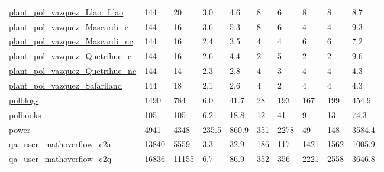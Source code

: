 \begin{longtable}{llllllllll}
 \href{https://iwdb.nceas.ucsb.edu/html/vazquez_2002.html}{plant\_pol\_vazquez\_Llao\_Llao}                                     & 144        & 20    & 3.0    & 4.6    & 8     & 6      & 8      & 8      & 8.7     \\
 \href{https://iwdb.nceas.ucsb.edu/html/vazquez_2002.html}{plant\_pol\_vazquez\_Mascardi\_c}                                    & 144        & 16    & 3.6    & 5.3    & 8     & 6      & 4      & 4      & 9.3     \\
 \href{https://iwdb.nceas.ucsb.edu/html/vazquez_2002.html}{plant\_pol\_vazquez\_Mascardi\_nc}                                   & 144        & 16    & 2.4    & 3.5    & 4     & 4      & 6      & 6      & 7.2     \\
 \href{https://iwdb.nceas.ucsb.edu/html/vazquez_2002.html}{plant\_pol\_vazquez\_Quetrihue\_c}                                   & 144        & 16    & 2.6    & 4.4    & 2     & 5      & 2      & 2      & 9.6     \\
 \href{https://iwdb.nceas.ucsb.edu/html/vazquez_2002.html}{plant\_pol\_vazquez\_Quetrihue\_nc}                                  & 144        & 14    & 2.3    & 2.8    & 4     & 3      & 4      & 4      & 4.3     \\
 \href{https://iwdb.nceas.ucsb.edu/html/vazquez_2002.html}{plant\_pol\_vazquez\_Safariland}                                    & 144        & 18    & 2.1    & 2.6    & 4     & 2      & 4      & 4      & 4.3     \\
 \href{http://www-personal.umich.edu/~mejn/netdata}{polblogs}                                                               & 1490       & 784   & 6.0    & 41.7   & 28    & 193    & 167    & 199    & 454.9   \\
 \href{http://www-personal.umich.edu/~mejn/netdata}{polbooks}                                                               & 105        & 105   & 6.2    & 18.8   & 12    & 41     & 9      & 13     & 74.3    \\
 \href{http://www-personal.umich.edu/~mejn/netdata/}{power}                                                                 & 4941       & 4348  & 235.5  & 860.9  & 351   & 2278   & 49     & 148    & 3584.4  \\
 \href{http://snap.stanford.edu/data/sx-stackoverflow.html}{qa\_user\_mathoverflow\_c2a}                                       & 13840      & 5559  & 3.3    & 32.9   & 186   & 117    & 1421   & 1562   & 1005.9  \\
 \href{http://snap.stanford.edu/data/sx-stackoverflow.html}{qa\_user\_mathoverflow\_c2q}                                       & 16836      & 11155 & 6.7    & 86.9   & 352   & 356    & 2221   & 2558   & 3646.8  \\

\end{longtable}
